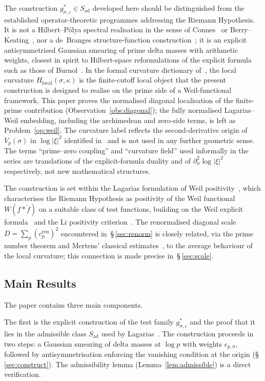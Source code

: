 \documentclass[11pt]{article}
\newcommand{\Hlocal}{H_{\mathrm{local}}}
\newcommand{\Sad}{S_{\mathrm{ad}}}
\newcommand{\cren}{c_p^{\mathrm{ren}}}
\begin{document}
The construction $g^*_{\sigma,\varepsilon}\in\Sad$ developed here
should be distinguished from the established operator-theoretic
programmes addressing the Riemann Hypothesis.
It is not a Hilbert--P\'olya spectral realisation in the sense of
Connes~\cite{Connes} or Berry--Keating~\cite{BerryKeating}, nor a
de~Branges structure-function construction~\cite{deBranges}; it
is an explicit antisymmetrised Gaussian smearing of prime delta
masses with arithmetic weights, closest in spirit to Hilbert-space
reformulations of the explicit formula such as those of
Burnol~\cite{Burnol}.
In the formal curvature dictionary of~\cite{Paper1}, the local
curvature $\Hlocal(\sigma,\kappa)$ is the finite-cutoff local
object that the present construction is designed to realise on
the prime side of a Weil-functional framework.
This paper proves the normalised diagonal localisation of the
finite-prime contribution (Observation~\ref{obs:diagonal}); the fully
normalised Lagarias--Weil embedding, including the archimedean
and zero-side terms, is left as Problem~\ref{op:weil}.
The curvature label reflects the
second-derivative origin of $V_p(\sigma)$ in $\log|\xi|^2$
identified in~\cite{Paper1} and is not used in any further
geometric sense.
The terms ``prime--zero coupling'' and ``curvature field'' used
informally in the series are translations of the explicit-formula
duality and of $\partial_\sigma^2\log|\xi|^2$ respectively, not
new mathematical structures.

The construction is set within the Lagarias formulation of Weil
positivity~\cite{Lagarias}, which characterises the Riemann
Hypothesis as positivity of the Weil functional $W(f*\check f)$
on a suitable class of test functions, building on the Weil
explicit formula~\cite{Weil} and the Li positivity
criterion~\cite{Li}.
The renormalised diagonal scale $D=\sum_p(\cren)^2$ encountered
in~\S\,\ref{sec:renorm} is closely related, via the prime number
theorem and Mertens' classical estimates~\cite{Mertens}, to the
average behaviour of the local curvature; this connection is
made precise in~\S\,\ref{sec:scale}.

\subsection{Main Results}

The paper contains three main components.

The first is the explicit construction of the test family
$g^*_{\sigma,\varepsilon}$ and the proof that it lies in the
admissible class $\Sad$ used by Lagarias~\cite{Lagarias}.
The construction proceeds in two steps: a Gaussian smearing of
delta masses at $\log p$ with weights $c_{p,\sigma}$, followed
by antisymmetrisation enforcing the vanishing condition at the
origin (\S\,\ref{sec:construct}).
The admissibility lemma (Lemma~\ref{lem:admissible}) is a
direct verification.
\end{document}
